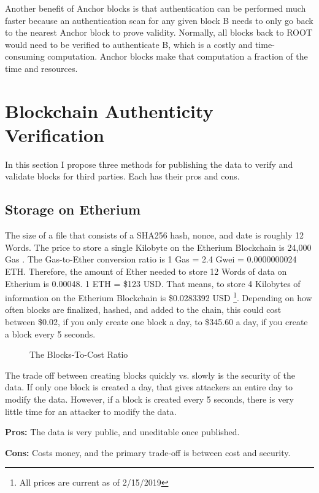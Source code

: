         Another benefit of Anchor blocks is that authentication can be performed much faster because an authentication scan for any given block B needs to only go back to the nearest Anchor block to prove validity. Normally, all blocks back to ROOT would need to be verified to authenticate B, which is a costly and time-consuming computation. Anchor blocks make that computation a fraction of the time and resources.
        
        
        
         \section{Blockchain Authenticity Verification}
In this section I propose three methods for publishing the data to verify and validate blocks for third parties. Each has their pros and cons. 
\subsection{Storage on Etherium}{
The size of a file that consists of a SHA256 hash, nonce, and date is roughly 12 Words. The price to store a single Kilobyte on the Etherium Blockchain is 24,000 Gas \cite{EthCosts}. The Gas-to-Ether conversion ratio is 1 Gas = 2.4 Gwei = 0.0000000024 ETH. Therefore, the amount of Ether needed to store 12 Words of data on Etherium is 0.00048. 1 ETH = \$123 USD. That means, to store 4 Kilobytes of information on the Etherium Blockchain is \$0.0283392 USD \footnote{All prices are current as of 2/15/2019}. Depending on how often blocks are finalized, hashed, and added to the chain, this could cost between \$0.02, if you only create one block a day, to \$345.60 a day, if you create a block every 5 seconds. 
\begin{figure}[hbt!]
    \centering
{}
    \caption{The Blocks-To-Cost Ratio}
    \label{fig:my_label}
\end{figure}

The trade off between creating blocks quickly vs. slowly is the security of the data. If only one block is created a day, that gives attackers an entire day to modify the data. However, if a block is created every 5 seconds, there is very little time for an attacker to modify the data.

\textbf{Pros:} The data is very public, and uneditable once published.

\textbf{Cons:} Costs money, and the primary trade-off is between cost and security.
}

